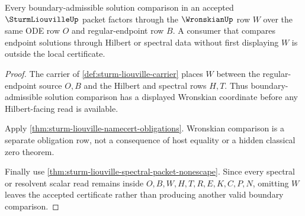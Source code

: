 \begin{theorem}
\label{thm:sturm-liouville-wronskian-boundary}
Every boundary-admissible solution comparison in an accepted $\SturmLiouvilleUp$ packet factors through the $\WronskianUp$ row $W$ over the same ODE row $O$ and regular-endpoint row $B$. A consumer that compares endpoint solutions through Hilbert or spectral data without first displaying $W$ is outside the local certificate.
\end{theorem}
\begin{proof}
The carrier of \autoref{def:sturm-liouville-carrier} places $W$ between the regular-endpoint source $O,B$ and the Hilbert and spectral rows $H,T$. Thus boundary-admissible solution comparison has a displayed Wronskian coordinate before any Hilbert-facing read is available.

Apply \autoref{thm:sturm-liouville-namecert-obligations}. Wronskian comparison is a separate obligation row, not a consequence of host equality or a hidden classical zero theorem.

Finally use \autoref{thm:sturm-liouville-spectral-packet-nonescape}. Since every spectral or resolvent scalar read remains inside $O,B,W,H,T,R,E,K,C,P,N$, omitting $W$ leaves the accepted certificate rather than producing another valid boundary comparison.
\end{proof}




